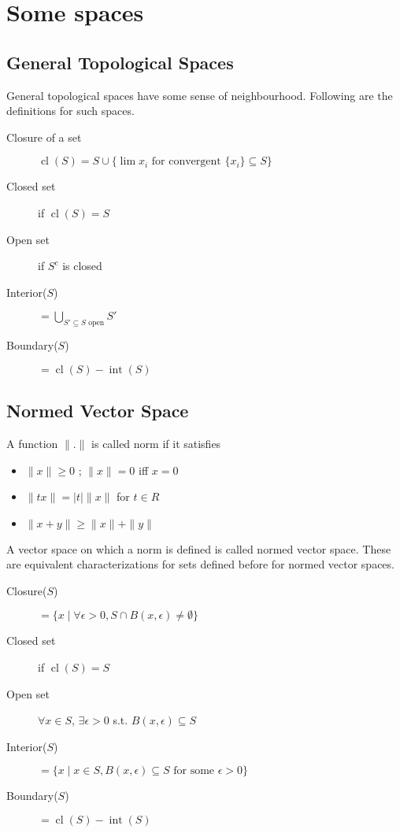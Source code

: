 \documentclass[a4paper,11pt]{article}
\newcommand{\cl}{\operatorname{cl}}
\newcommand{\intr}{\operatorname{int}}
\begin{document}
\section{Some spaces}
\subsection{General Topological Spaces}
General topological spaces have some sense of neighbourhood. Following are the definitions for such spaces.
\begin{description}
\item[Closure of a set] $\cl(S) = S \cup \{\lim x_i \text{ for convergent }\{x_i\} \subseteq S \}$
\item[Closed set] if $\cl(S) = S$
\item[Open set] if $S^c$ is closed
\item[Interior($S$)] $= \bigcup_{S' \subseteq S \text{ open}} S'$
\item[Boundary($S$)] $= \cl(S) - \intr(S)$
\end{description}

\subsection{Normed Vector Space}
A function $\|.\|$ is called norm if it satisfies
\begin{itemize}
\item $\|x\| \geq 0$ ; $\| x\| = 0$ iff $x = 0$
\item $\| tx \| = |t|\|x \|$ for $t \in R$
\item $\|x + y\| \geq \|x\| + \|y\|$ 
\end{itemize}
A vector space on which a norm is defined is called normed vector space. These are equivalent characterizations for sets defined before for normed vector spaces. 
\begin{description}
\item[Closure($S$)] $ = \{x \mid \forall \epsilon > 0, S \cap B(x,\epsilon) \neq \emptyset \}$
\item[Closed set] if $\cl(S) = S$
\item[Open set] $\forall x \in S$, $\exists \epsilon >0$ s.t. $B(x,\epsilon) \subseteq S$
\item[Interior($S$)] $= \{x \mid x\in S, B(x,\epsilon) \subseteq S \text{ for some }\epsilon >0\}$
\item[Boundary($S$)] $= \cl(S) - \intr(S)$
\end{description}
\end{document}

